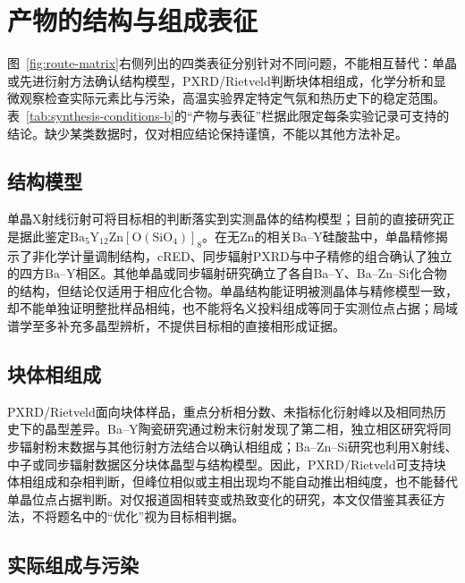 \section{产物的结构与组成表征}
\label{sec:validation-endpoints}

图~\ref{fig:route-matrix}\CJKecglue{}右侧列出的四类表征分别针对不同问题，不能相互替代：单晶或先进衍射方法确认结构模型，PXRD\slash Rietveld判断块体相组成，化学分析和显微观察检查实际元素比与污染，高温实验界定特定气氛和热历史下的稳定范围。表~\ref{tab:synthesis-conditions-b}\CJKecglue{}的“产物与表征”栏据此限定每条实验记录可支持的结论。缺少某类数据时，仅对相应结论保持谨慎，不能以其他方法补足。

\subsection{结构模型}

单晶X射线衍射可将目标相的判断落实到实测晶体的结构模型；目前的直接研究正是据此鉴定$\mathrm{Ba_5Y_{12}Zn[O(SiO_4)]_8}$\CJKecglue{}\cite{ababaikeri2024ba5y12zn}。在无Zn的相关Ba--Y硅酸盐中，单晶精修揭示了非化学计量调制结构，cRED、同步辐射PXRD与中子精修的组合确认了独立的四方Ba--Y相区\cite{yamane2024synthesis,gulay2024navigation}。其他单晶或同步辐射研究确立了各自Ba--Y、Ba--Zn--Si化合物的结构，但结论仅适用于相应化合物\cite{motozawa2022bay16si4o33,zou2021crystal}。单晶结构能证明被测晶体与精修模型一致，却不能单独证明整批样品相纯，也不能将名义投料组成等同于实测位点占据；局域谱学至多补充多晶型辨析，不提供目标相的直接相形成证据\cite{becerro2004revisiting}。

\subsection{块体相组成}

PXRD\slash Rietveld面向块体样品，重点分析相分数、未指标化衍射峰以及相同热历史下的晶型差异。Ba--Y陶瓷研究通过粉末衍射发现了第二相，独立相区研究将同步辐射粉末数据与其他衍射方法结合以确认相组成\cite{yamane2024microstructure,gulay2024navigation}；Ba--Zn--Si研究也利用X射线、中子或同步辐射数据区分块体晶型与结构模型\cite{lin1999phase,zou2021crystal}。因此，PXRD\slash Rietveld可支持块体相组成和杂相判断，但峰位相似或主相出现均不能自动推出相纯度，也不能替代单晶位点占据判断。对仅报道固相转变或热致变化的研究，本文仅借鉴其表征方法，不将题名中的“优化”视为目标相判据\cite{kerstan2012thermal,cai2024optimized}。

\subsection{实际组成与污染}

